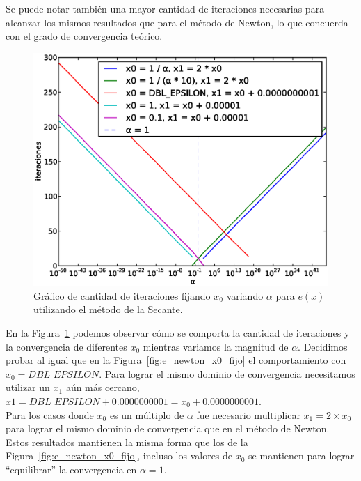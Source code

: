 Se puede notar también una mayor cantidad de iteraciones necesarias para
alcanzar los mismos resultados que para el método de Newton, lo que concuerda
con el grado de convergencia teórico.\\

\begin{figure}[!htbp]
  \begin{center}
    \includegraphics[scale=0.5]{graficos/new/e_secante_x0_fijo.eps}
    \caption{\label{fig:e_secante_x0_fijo} Gráfico de cantidad de iteraciones fijando $x_0$ variando $\alpha$ para $e(x)$ utilizando el método de la Secante.}
  \end{center}
\end{figure}

En la Figura~\ref{fig:e_secante_x0_fijo} podemos observar cómo se comporta la
cantidad de iteraciones y la convergencia de diferentes $x_0$ mientras variamos
la magnitud de $\alpha$. Decidimos probar al igual que en la
Figura~\ref{fig:e_newton_x0_fijo} el comportamiento con $x_0 =
\textit{DBL\_EPSILON}$. Para lograr el mismo dominio de convergencia
necesitamos utilizar un $x_1$ aún más cercano,  $x1 = \textit{DBL\_EPSILON} +
0.0000000001 = x_0 + 0.0000000001$.\\

Para los casos donde $x_0$ es un múltiplo de $\alpha$ fue necesario multiplicar
$x_1 = 2 \times x_0$ para lograr el mismo dominio de convergencia que en el método
de Newton.\\

Estos resultados mantienen la misma forma que los de la
Figura~\ref{fig:e_newton_x0_fijo}, incluso los valores de $x_0$ se mantienen
para lograr ``equilibrar'' la convergencia en $\alpha = 1$.\\


